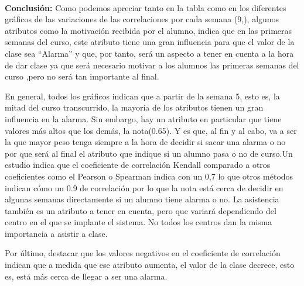\paragraph{}
\textbf{Conclusión:} Como  podemos apreciar tanto en la tabla como en los diferentes gráficos de las variaciones de las correlaciones por cada semana (9,), algunos atributos como la motivación recibida por el alumno, indica que en las primeras semanas del curso, este atributo tiene una gran influencia para que el valor de la clase sea “Alarma” y que, por tanto, será un aspecto a tener en cuenta a la hora de dar clase ya que será necesario motivar a los alumnos las primeras semanas del curso ,pero no será tan importante al final.

En general, todos los gráficos indican que a partir de la semana 5, esto es, la mitad del curso transcurrido, la mayoría de los atributos tienen un gran influencia en la alarma. Sin embargo, hay un atributo en particular que tiene valores más altos que los demás, la nota(0.65). Y es que, al fin y al cabo, va a ser la que mayor peso tenga siempre a la hora de decidir si sacar una alarma o no por que será al final el atributo que indique si un alumno pasa o no de curso.Un estudio \cite{coeficienteDeCorrelacionKendall2} indica que el coeficiente de correlación Kendall comparado a otros coeficientes como el Pearson o Spearman indica con un 0,7 lo que otros métodos indican cómo un 0.9 de correlación por lo que la nota está cerca de decidir en algunas semanas directamente si un alumno tiene alarma o no.
La asistencia también es un atributo a tener en cuenta, pero que variará dependiendo del centro en el que se implante el sistema. No todos los centros dan la misma importancia a asistir a clase.

Por último, destacar que los valores negativos en el coeficiente de correlación indican que a medida que ese atributo aumenta, el valor de la clase decrece, esto es, está más cerca de llegar a ser una alarma.

